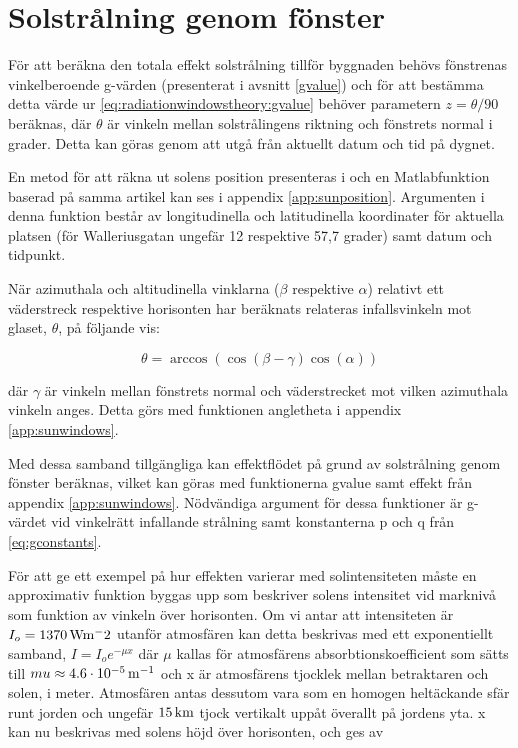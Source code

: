 \section{Solstrålning genom fönster}\label{sec:sunthroughwindowsmethod}

För att beräkna den totala effekt solstrålning tillför byggnaden behövs fönstrenas vinkelberoende g-värden (presenterat i avsnitt \ref{gvalue}) och för att bestämma detta värde ur \eqref{eq:radiationwindowstheory:gvalue} behöver parametern $z = \theta/90$ beräknas, där $\theta$ är vinkeln mellan solstrålingens riktning och fönstrets normal i grader. Detta kan göras genom att utgå från aktuellt datum och tid på dygnet.

En metod för att räkna ut solens position presenteras i \cite{walraven78} och en Matlabfunktion baserad på samma artikel kan ses i appendix \ref{app:sunposition}. Argumenten i denna funktion består av longitudinella och latitudinella koordinater för aktuella platsen (för Walleriusgatan ungefär 12 respektive 57,7 grader) samt datum och tidpunkt.

När azimuthala och altitudinella vinklarna ($\beta$ respektive $\alpha$) relativt ett väderstreck respektive horisonten har beräknats relateras infallsvinkeln mot glaset, $\theta$, på följande vis:

\begin{equation} 
\theta = \arccos{\left( \cos{\left(\beta - \gamma\right)}\cos{\left(\alpha\right)}\right)}
\end{equation}

där $\gamma$ är vinkeln mellan fönstrets normal och väderstrecket mot vilken azimuthala vinkeln anges. Detta görs med funktionen angletheta i appendix \ref{app:sunwindows}.

Med dessa samband tillgängliga kan effektflödet på grund av solstrålning genom fönster beräknas, vilket kan göras med funktionerna gvalue samt effekt från appendix \ref{app:sunwindows}. Nödvändiga argument för dessa funktioner är g-värdet vid vinkelrätt infallande strålning samt konstanterna p och q från \eqref{eq:gconstants}.

För att ge ett exempel på hur effekten varierar med solintensiteten måste en approximativ funktion byggas upp som beskriver solens intensitet vid marknivå som funktion av vinkeln över horisonten. Om vi antar att intensiteten är $I_o = \unit[1370]{Wm^-2}$ utanför atmosfären kan detta beskrivas med ett exponentiellt samband, $I = I_oe^{-\mu x}$ där $\mu$ kallas för atmosfärens absorbtionskoefficient som sätts till $mu\approx \unit[4.6\cdot 10^{-5}]{m^{-1}}$ och x är atmosfärens tjocklek mellan betraktaren och solen, i meter. Atmosfären antas dessutom vara som en homogen heltäckande sfär runt jorden och ungefär $\unit[15]{km}$ tjock vertikalt uppåt överallt på jordens yta. x kan nu beskrivas med solens höjd över horisonten, och ges av

